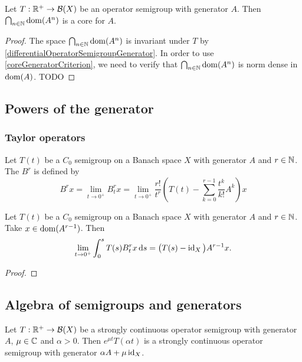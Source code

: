 \begin{proposition} \label{domAinftyCore}
Let $T: \mathbb{R}^+\to \operatorname{\mathcal{B}}(X)$ be an operator semigroup with generator $A$. Then $\bigcap_{n\in\mathbb{N}}\operatorname{dom}(A^n)$ is a core for $A$.
\end{proposition}
\begin{proof}
The space $\bigcap_{n\in\mathbb{N}}\operatorname{dom}(A^n)$ is invariant under $T$ by \ref{differentialOperatorSemigroupGenerator}. In order to use \ref{coreGeneratorCriterion}, we need to verify that $\bigcap_{n\in\mathbb{N}}\operatorname{dom}(A^n)$ is norm dense in $\operatorname{dom} (A)$. TODO
\end{proof}

\subsection{Powers of the generator}
\subsubsection{Taylor operators}
\begin{definition}
Let $T(t)$ be a $C_0$ semigroup on a Banach space $X$ with generator $A$ and $r\in \mathbb{N}$. The  $B^r$ is defined by
\[ B^rx = \lim_{t\to 0^+}B_t^rx = \lim_{t\to 0^+}\frac{r!}{t^r}\left(T(t) - \sum^{r-1}_{k=0}\frac{t^k}{k!}A^k\right)x \]
\end{definition}

\begin{lemma}
Let $T(t)$ be a $C_0$ semigroup on a Banach space $X$ with generator $A$ and $r\in \mathbb{N}$. Take $x\in\operatorname{dom}(A^{r-1})$. Then
\[ \lim_{t\to 0^+} \int_0^s T(s)B_t^r x \operatorname{d \!}{s} = \big(T(s)-\operatorname{id}_X\big)A^{r-1}x. \]
\end{lemma}
\begin{proof}

\end{proof}

\subsection{Algebra of semigroups and generators}
\begin{proposition}
Let $T: \mathbb{R}^+\to \operatorname{\mathcal{B}}(X)$ be a strongly continuous operator semigroup with generator $A$, $\mu\in\mathbb{C}$ and $\alpha >0$. Then $e^{\mu t}T(\alpha t)$ is a strongly continuous operator semigroup with generator $\alpha A + \mu\operatorname{id}_X$.
\end{proposition}

